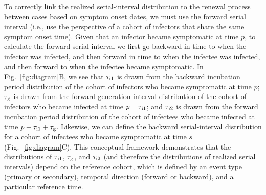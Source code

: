 \documentclass[12pt]{article}
\newcommand{\fref}[1]{Fig.~\ref{fig:#1}}
\newcommand{\psymp}{\ensuremath{p}} %
\newcommand{\ssymp}{\ensuremath{s}} %
\newcommand{\gtime}{\tau_{\rm g}} %
\begin{document}
To correctly link the realized serial-interval distribution to the renewal process
between cases based on symptom onset dates, we must use the forward
serial interval (i.e., use the perspective of a cohort of infectors
that share the same symptom onset time).  Given that an infector
became symptomatic at time $\psymp$, to calculate the forward serial
interval we first go backward in time to when the infector was
infected, and then forward in time to when the infectee was infected,
and then forward to when the infectee became symptomatic.
In \fref{diagram}B, we see that $\tau_{\rm i1}$ is drawn from
the backward incubation period distribution of the cohort
of infectors who became symptomatic at time $\psymp$; $\gtime$ is drawn from
the forward generation-interval distribution of the cohort of
infectors who became infected at time $\psymp - \tau_{\rm i1}$; and $\tau_{\rm i2}$
is drawn from the forward incubation period distribution of the cohort of
infectees who became infected at time $\psymp - \tau_{\rm i1} + \gtime$.
Likewise, we can define the backward serial-interval distribution for
a cohort of infectees who became symptomatic at time $\ssymp$
(\fref{diagram}C).  This conceptual framework demonstrates
that the distributions of $\tau_{\rm i1}$, $\gtime$, and $\tau_{\rm i2}$ (and therefore
the distributions of realized serial intervals) depend on the
reference cohort, which is defined by an event type (primary or secondary),
temporal direction (forward or backward), and a particular reference time.
\end{document}
